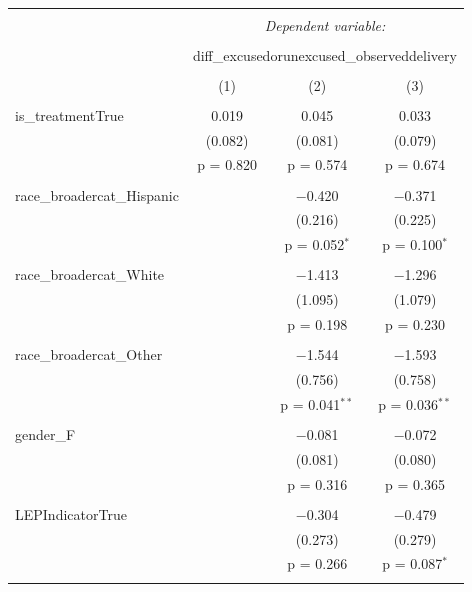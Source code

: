 
\begin{table}[!htbp] \centering 
  \caption{} 
  \label{} 
\begin{tabular}{@{\extracolsep{5pt}}lccc} 
\\[-1.8ex]\hline 
\hline \\[-1.8ex] 
 & \multicolumn{3}{c}{\textit{Dependent variable:}} \\ 
\cline{2-4} 
\\[-1.8ex] & \multicolumn{3}{c}{diff\_excusedorunexcused\_observeddelivery} \\ 
\\[-1.8ex] & (1) & (2) & (3)\\ 
\hline \\[-1.8ex] 
 is\_treatmentTrue & 0.019 & 0.045 & 0.033 \\ 
  & (0.082) & (0.081) & (0.079) \\ 
  & p = 0.820 & p = 0.574 & p = 0.674 \\ 
  & & & \\ 
 race\_broadercat\_Hispanic &  & $-$0.420 & $-$0.371 \\ 
  &  & (0.216) & (0.225) \\ 
  &  & p = 0.052$^{*}$ & p = 0.100$^{*}$ \\ 
  & & & \\ 
 race\_broadercat\_White &  & $-$1.413 & $-$1.296 \\ 
  &  & (1.095) & (1.079) \\ 
  &  & p = 0.198 & p = 0.230 \\ 
  & & & \\ 
 race\_broadercat\_Other &  & $-$1.544 & $-$1.593 \\ 
  &  & (0.756) & (0.758) \\ 
  &  & p = 0.041$^{**}$ & p = 0.036$^{**}$ \\ 
  & & & \\ 
 gender\_F &  & $-$0.081 & $-$0.072 \\ 
  &  & (0.081) & (0.080) \\ 
  &  & p = 0.316 & p = 0.365 \\ 
  & & & \\ 
 LEPIndicatorTrue &  & $-$0.304 & $-$0.479 \\ 
  &  & (0.273) & (0.279) \\ 
  &  & p = 0.266 & p = 0.087$^{*}$ \\ 
  & & & \\ 

\end{tabular}
\end{table}
